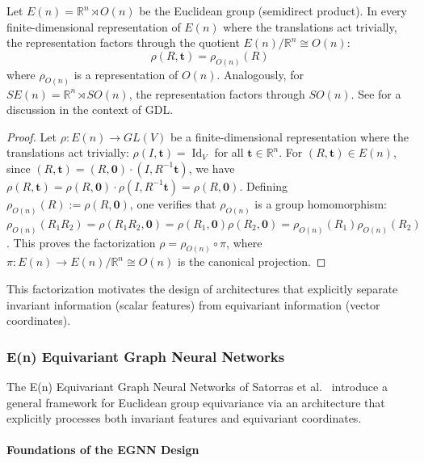 \begin{proposition}\label{prop:descomp_repr_en}
Let $E(n) = \mathbb{R}^n \rtimes O(n)$ be the Euclidean group (semidirect product). In every finite-dimensional representation of $E(n)$ where the translations act trivially, the representation factors through the quotient $E(n)/\mathbb{R}^n \cong O(n)$:
\begin{equation}
\rho(R, \mathbf{t}) = \rho_{O(n)}(R)
\end{equation}
where $\rho_{O(n)}$ is a representation of $O(n)$. Analogously, for $SE(n) = \mathbb{R}^n \rtimes SO(n)$, the representation factors through $SO(n)$. See \citep{DBLP:journals/corr/abs-2104-13478} for a discussion in the context of GDL.
\end{proposition}

\begin{proof}
Let $\rho: E(n) \to GL(V)$ be a finite-dimensional representation where the translations act trivially: $\rho(I, \mathbf{t}) = \operatorname{Id}_V$ for all $\mathbf{t} \in \mathbb{R}^n$. For $(R, \mathbf{t}) \in E(n)$, since $(R, \mathbf{t}) = (R, \mathbf{0}) \cdot (I, R^{-1}\mathbf{t})$, we have $\rho(R, \mathbf{t}) = \rho(R, \mathbf{0}) \cdot \rho(I, R^{-1}\mathbf{t}) = \rho(R, \mathbf{0})$. Defining $\rho_{O(n)}(R) := \rho(R, \mathbf{0})$, one verifies that $\rho_{O(n)}$ is a group homomorphism: $\rho_{O(n)}(R_1 R_2) = \rho(R_1 R_2, \mathbf{0}) = \rho(R_1, \mathbf{0}) \rho(R_2, \mathbf{0}) = \rho_{O(n)}(R_1) \rho_{O(n)}(R_2)$. This proves the factorization $\rho = \rho_{O(n)} \circ \pi$, where $\pi: E(n) \to E(n)/\mathbb{R}^n \cong O(n)$ is the canonical projection.
\end{proof}

This factorization motivates the design of architectures that explicitly separate invariant information (scalar features) from equivariant information (vector coordinates).

\subsubsection{E(n) Equivariant Graph Neural Networks}

The E(n) Equivariant Graph Neural Networks of Satorras et al.~\citep{satorras2021enequivariant} introduce a general framework for Euclidean group equivariance via an architecture that explicitly processes both invariant features and equivariant coordinates.

\paragraph{Foundations of the EGNN Design}

